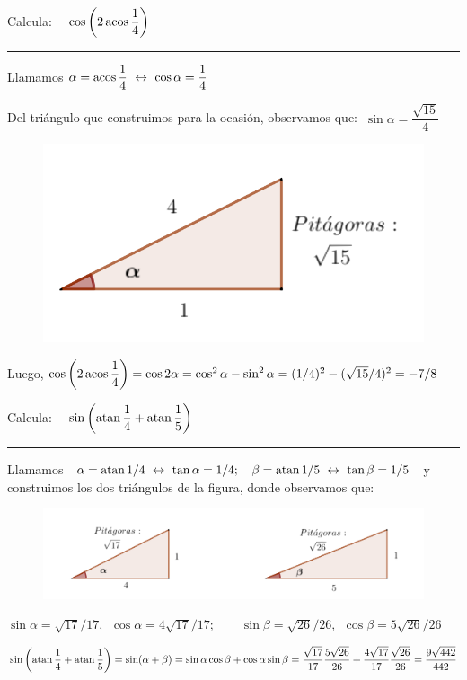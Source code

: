 \begin{miejercicio}

Calcula: $\quad \cos \left( 2 \acos \dfrac 1 4 \right)$

\rule{250pt}{0.1pt}

\vspace{4mm}
	
\begin{multicols}{2}
Llamamos  $\alpha= \acos \dfrac 1 4 \ \leftrightarrow \  \cos \alpha=\dfrac 14$

\vspace{4mm} Del triángulo que construimos para la ocasión, observamos que: $\ \sin \alpha=\dfrac{\sqrt{15}}{4}$

\begin{figure}[H]
	\centering
	\includegraphics[width=.4\textwidth]{img-ft/ft05.png}
	\end{figure}	
\end{multicols}

Luego, $\cos \left( 2 \acos \dfrac 1 4 \right)=\cos 2\alpha=\cos^2 \alpha-\sin^2 \alpha = (1/4)^2 - (\sqrt{15}/4)^2=-7/8$
\end{miejercicio}




\begin{miejercicio}

Calcula: $\quad \sin \left( \atan \dfrac 1 4 + \atan \dfrac 1 5 \right)$

\rule{250pt}{0.1pt}

\vspace{4mm}
Llamamos  $\ \alpha= \atan 1/4 \ \leftrightarrow \ \tan \alpha = 1/4;\quad  \beta = \atan 1/5 \ \leftrightarrow \ \tan \beta =1/5\ $ y construimos los dos triángulos de la figura, donde observamos que:

\begin{figure}[H]
	\centering
	\includegraphics[width=.9\textwidth]{img-ft/ft06.png}
	\end{figure}	
$\sin \alpha= \sqrt{17}/17,\ \ \cos \alpha= 4\sqrt{17}/17;\qquad \sin \beta= \sqrt{26}/26,\ \ \cos \beta= 5\sqrt{26}/26$

\vspace{2mm} $\sin \left( \atan \dfrac 1 4 + \atan \dfrac 1 5 \right)=\sin(\alpha + \beta) = \sin \alpha \cos \beta + \cos \alpha \sin \beta =  \dfrac{\sqrt{17}}{17}\dfrac{5\sqrt{26}}{26}+\dfrac{4\sqrt{17}}{17}\dfrac{\sqrt{26}}{26}= \dfrac{9\sqrt{442}}{442}$

\end{miejercicio}


